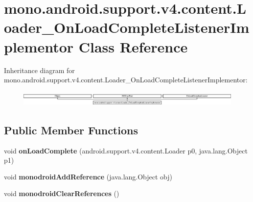 \hypertarget{classmono_1_1android_1_1support_1_1v4_1_1content_1_1_loader___on_load_complete_listener_implementor}{}\section{mono.\+android.\+support.\+v4.\+content.\+Loader\+\_\+\+On\+Load\+Complete\+Listener\+Implementor Class Reference}
\label{classmono_1_1android_1_1support_1_1v4_1_1content_1_1_loader___on_load_complete_listener_implementor}
Inheritance diagram for mono.\+android.\+support.\+v4.\+content.\+Loader\+\_\+\+On\+Load\+Complete\+Listener\+Implementor\+:\begin{figure}[H]
\begin{center}
\leavevmode
\includegraphics[height=0.801144cm]{classmono_1_1android_1_1support_1_1v4_1_1content_1_1_loader___on_load_complete_listener_implementor}
\end{center}
\end{figure}
\subsection*{Public Member Functions}
\begin{DoxyCompactItemize}
\item 
\mbox{\label{classmono_1_1android_1_1support_1_1v4_1_1content_1_1_loader___on_load_complete_listener_implementor_a9b4a8a9e279f40edd649d27a3078c7e0}} 
void {\bfseries on\+Load\+Complete} (android.\+support.\+v4.\+content.\+Loader p0, java.\+lang.\+Object p1)
\item 
\mbox{\label{classmono_1_1android_1_1support_1_1v4_1_1content_1_1_loader___on_load_complete_listener_implementor_a3a4c9ef8ad15330e6de3d2665a8cc66e}} 
void {\bfseries monodroid\+Add\+Reference} (java.\+lang.\+Object obj)
\item 
\mbox{\label{classmono_1_1android_1_1support_1_1v4_1_1content_1_1_loader___on_load_complete_listener_implementor_ada446ac79bc14bf9ee76ba6859226059}} 
void {\bfseries monodroid\+Clear\+References} ()
\end{DoxyCompactItemize}

